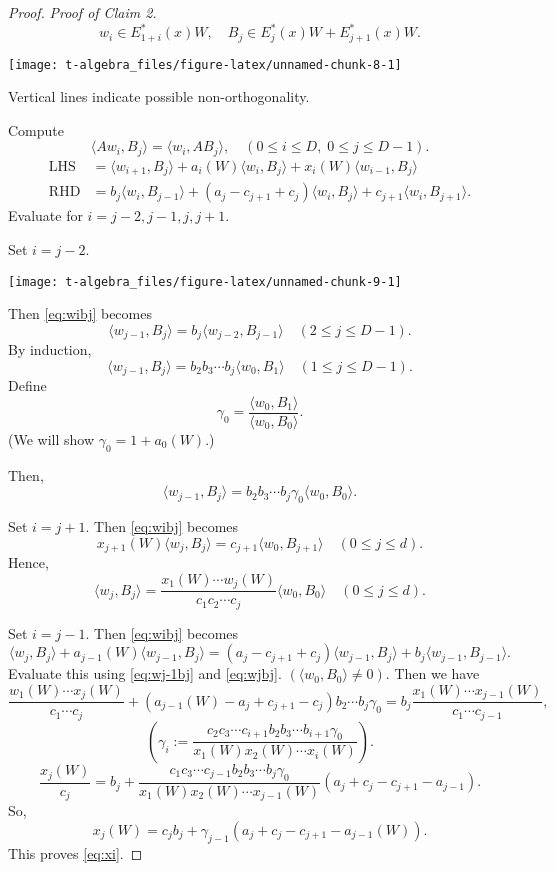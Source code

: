 \documentclass[
]{book}
\theoremstyle{definition}
\theoremstyle{definition}
\theoremstyle{definition}
\theoremstyle{definition}
\theoremstyle{remark}
\begin{document}
\begin{proof}
\emph{Proof of Claim 2.}
\[w_i\in E^*_{1+i}(x)W, \quad B_j\in E^*_j(x)W + E^*_{j+1}(x)W.\]

\begin{center}\texttt{[image: t-algebra\_files/figure-latex/unnamed-chunk-8-1]} \end{center}

Vertical lines indicate possible non-orthogonality.

Compute
\begin{equation}
\langle Aw_i, B_j\rangle = \langle w_i, AB_j\rangle, \quad (0\leq i\leq D, \; 0\leq j\leq D-1).\label{eq:wibj}
\end{equation}
\begin{align}
\text{LHS} & = \langle w_{i+1},B_j\rangle + a_i(W)\langle w_i,B_j\rangle + x_i(W)\langle w_{i-1},B_j\rangle\\
\text{RHD}& = b_j\langle w_i, B_{j-1}\rangle + (a_j-c_{j+1}+c_j)\langle w_i, B_j\rangle + c_{j+1}\langle w_i, B_{j+1}\rangle.
\end{align}
Evaluate for \(i = j-2, j-1, j, j+1\).

Set \(i = j-2\).

\begin{center}\texttt{[image: t-algebra\_files/figure-latex/unnamed-chunk-9-1]} \end{center}

Then \eqref{eq:wibj} becomes
\[\langle w_{j-1}, B_j\rangle = b_j\langle w_{j-2},B_{j-1}\rangle \quad (2\leq j\leq D-1).\]
By induction,
\[\langle w_{j-1}, B_j\rangle = b_2b_3\cdots b_j\langle w_{0},B_{1}\rangle \quad (1\leq j\leq D-1).\]
Define
\[\gamma_0 = \frac{\langle w_0, B_1\rangle}{\langle w_0, B_0\rangle}.\]
(We will show \(\gamma_0 = 1+a_0(W)\).)

Then,
\begin{equation}
\langle w_{j-1},B_j\rangle = b_2b_3\cdots b_j\gamma_0\langle w_0, B_0\rangle. \label{eq:wj-1bj}
\end{equation}

Set \(i = j+1\).
Then \eqref{eq:wibj} becomes
\[x_{j+1}(W)\langle w_j, B_j\rangle = c_{j+1}\langle w_0, B_{j+1}\rangle \quad (0\leq j\leq d).\]
Hence,
\begin{equation}
\langle w_j, B_j\rangle = \frac{x_1(W)\cdots w_j(W)}{c_1c_2\cdots c_j}\langle w_0, B_0\rangle \quad (0\leq j\leq d). \label{eq:wjbj}
\end{equation}

Set \(i = j-1\).
Then \eqref{eq:wibj} becomes
\[
\langle w_j, B_j\rangle + a_{j-1}(W)\langle w_{j-1}, B_j\rangle
 = (a_j-c_{j+1}+c_j)\langle w_{j-1},B_j\rangle + b_j\langle w_{j-1},B_{j-1}\rangle.
\]
Evaluate this using \eqref{eq:wj-1bj} and \eqref{eq:wjbj}. \((\langle w_0, B_0\rangle \neq 0)\). Then we have
\[\frac{w_1(W)\cdots x_j(W)}{c_1\cdots c_j}+(a_{j-1}(W)-a_j+c_{j+1}-c_j)b_2\cdots b_j\gamma_0 = b_j\frac{x_1(W)\cdots x_{j-1}(W)}{c_1\cdots c_{j-1}},\]
\[\left(\gamma_i:=\frac{c_2c_3\cdots c_{i+1}b_2b_3\cdots b_{i+1}\gamma_0}{x_1(W)x_2(W)\cdots x_i(W)} \right).\]
\[\frac{x_j(W)}{c_j}  = b_j + \frac{c_1c_3\cdots c_{j-1}b_2b_3\cdots b_{j}\gamma_0}{x_1(W)x_2(W)\cdots x_{j-1}(W)}(a_j+c_j-c_{j+1}-a_{j-1}).\]
So,
\[x_j(W)  = c_jb_j + \gamma_{j-1}(a_j+c_j-c_{j+1}-a_{j-1}(W)).\]
This proves \eqref{eq:xi}.


\end{proof}
\end{document}
